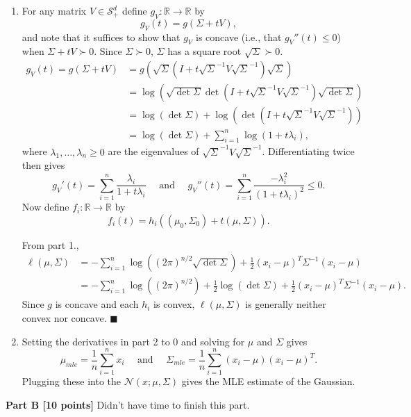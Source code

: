 \documentclass[11pt]{article}
\newcommand{\inv}{^{-1}}
\newcommand{\R}{\mathbb{R}}
\renewcommand{\qed}{\quad \ensuremath{\blacksquare}}
\begin{document}
\begin{enumerate}
\item For any matrix $V \in \mathcal{S}^d_+$ define $g_V : \R \to \R$ by
\[g_V(t) = g(\Sigma + tV),\]
and note that it suffices to show that $g_V$ is concave (i.e., that
$g_V''(t) \leq 0$) when $\Sigma + tV \succ 0$. Since $\Sigma \succ 0$, $\Sigma$
has a square root $\sqrt\Sigma \succ 0$.
\begin{align*}
g_V(t)
    = g\left( \Sigma + tV \right)
 &  = g\left( \sqrt\Sigma
        \left( I
        + t\sqrt\Sigma\inv V \sqrt\Sigma\inv \right) \sqrt\Sigma \right)    \\
 &  = \log \left( \sqrt{\det \Sigma}
                    \det \left( I + t\sqrt\Sigma\inv V \sqrt\Sigma\inv \right)
                        \sqrt{\det \Sigma} \right)                          \\
 &  = \log \left( \det \Sigma \right)
        + \log \left( \det \left( I
        + t\sqrt\Sigma\inv V \sqrt\Sigma\inv \right) \right)                \\
 &  = \log \left( \det \Sigma \right)
        + \sum_{i = 1}^n \log \left( 1 + t\lambda_i \right),
\end{align*}
where $\lambda_1,\dots,\lambda_n \geq 0$ are the eigenvalues of
$\sqrt\Sigma\inv V \sqrt\Sigma\inv$. Differentiating twice then gives
\[g_V'(t)
    = \sum_{i = 1}^n \frac{\lambda_i}{1 + t\lambda_i}
    \quad \mbox{ and } \quad
  g_V''(t)
    = \sum_{i = 1}^n \frac{-\lambda_i^2}{(1 + t\lambda_i)^2} \leq 0.
\]
Now define $f_i : \R \to \R$ by
\[f_i(t)
    = h_i((\mu_0,\Sigma_0) + t(\mu,\Sigma)).
\]

From part 1.,
\begin{align*}
\ell(\mu,\Sigma)
 &  = - \sum_{i = 1}^n \log \left( (2\pi)^{n/2}\sqrt{\det \Sigma} \right)
                        + \frac{1}{2} (x_i - \mu)^T \Sigma\inv (x_i - \mu)  \\
 &  = - \sum_{i = 1}^n \log \left( (2\pi)^{n/2} \right)
                        + \frac{1}{2} \log\left( \det \Sigma \right)
                        + \frac{1}{2} (x_i - \mu)^T \Sigma\inv (x_i - \mu).
\end{align*}
Since $g$ is concave and each $h_i$ is convex, $\ell(\mu,\Sigma)$ is generally
neither convex nor concave.  \qed

\item Setting the derivatives in part 2 to $0$ and solving for $\mu$ and
$\Sigma$ gives
\[\mu_{mle} = \frac{1}{n} \sum_{i = 1}^n x_i
    \quad \mbox{ and } \quad
    \Sigma_{mle} = \frac{1}{n} \sum_{i = 1}^n (x_i - \mu) (x_i - \mu)^T
.\]
Plugging these into the $\mathcal{N}(x;\mu,\Sigma)$ gives the MLE estimate of
the Gaussian.

\end{enumerate}

{\bf Part B [10 points]}
Didn't have time to finish this part.
\end{document}
